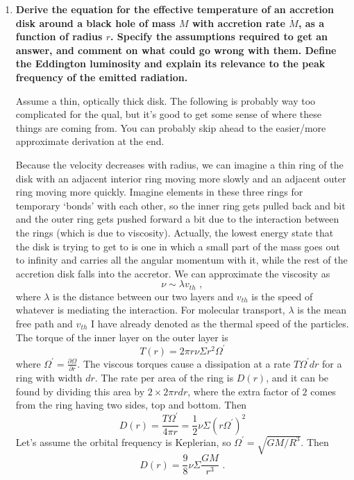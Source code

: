 \begin{enumerate}
\item \textbf{Derive the equation for the effective temperature of an accretion disk around a
      black hole of mass $M$ with accretion rate $\dot M$, as a function of radius $r$. Specify the
      assumptions required to get an answer, and comment on what could go wrong with
      them. Define the Eddington luminosity and explain its relevance to the peak frequency
      of the emitted radiation.}
      
      Assume a thin, optically thick disk. The following is probably way too complicated for the qual, but it's good to get some sense of where these things are coming from. You can probably skip ahead to the easier/more approximate derivation at the end.
      
      Because the velocity decreases with radius, we can imagine a thin ring of the disk with an adjacent interior ring moving more slowly and an adjacent outer ring moving more quickly. Imagine elements in these three rings for temporary `bonds' with each other, so the inner ring gets pulled back and bit and the outer ring gets pushed forward a bit due to the interaction between the rings (which is due to viscosity). Actually, the lowest energy state that the disk is trying to get to is one in which a small part of the mass goes out to infinity and carries all the angular momentum with it, while the rest of the accretion disk falls into the accretor. We can approximate the viscosity as
\begin{equation}
\nu \sim \lambda v_{th}\,\, ,
\end{equation}
where $\lambda$ is the distance between our two layers and $v_{th}$ is the speed of whatever is mediating the interaction. For molecular transport, $\lambda$ is the mean free path and $v_{th}$ I have already denoted as the thermal speed of the particles. The torque of the inner layer on the outer layer is
\begin{equation}
T(r) = 2 \pi r \nu \Sigma r^2 \Omega^\prime
\end{equation}
where $ \Omega^\prime = \frac{\partial \Omega}{\partial r}$. The viscous torques cause a dissipation at a rate $T \Omega^\prime dr$ for a ring with width $dr$. The rate per area of the ring is $D(r)$, and it can be found by dividing this area by $2 \times 2\pi r dr$, where the extra factor of $2$ comes from the ring having two sides, top and bottom. Then
\begin{equation}
D(r) = \frac{T \Omega^\prime}{4 \pi r}  = \frac{1}{2} \nu \Sigma (r \Omega^\prime)^2
\end{equation}
Let's assume the orbital frequency is Keplerian, so $\Omega^\prime = \sqrt{GM/R^3}$. Then
\begin{equation}
D(r) = \frac{9}{8} \nu \Sigma \frac{GM}{r^3}\,\,.
\end{equation}


\end{enumerate}
